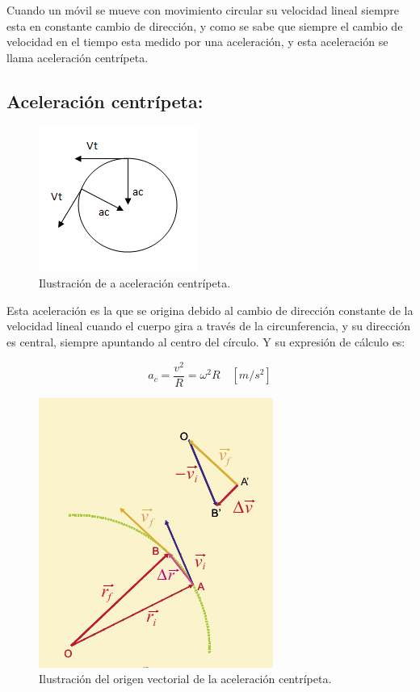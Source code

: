 \documentclass[a5paper,pagesize,10pt,bibtotoc,pointlessnumbers,
normalheadings,DIV=9,fleqn,x11names,table,twoside=false]{scrbook}
\begin{document}
Cuando un móvil se mueve con movimiento circular su velocidad lineal siempre esta en constante cambio de dirección, y como se 
sabe que siempre el cambio de velocidad en el tiempo esta medido por una aceleración, y esta aceleración se llama aceleración 
centrípeta.

\subsection{Aceleración centrípeta:}

\begin{figure}[ht]
 \centering
 \includegraphics[scale=0.6]{images/aceleracion-centripeta.jpg}
 \caption{Ilustración de a aceleración centrípeta.}\label{ac}
\end{figure}

Esta aceleración es la que se origina debido al cambio de dirección constante de la velocidad lineal cuando el cuerpo gira a 
través de la circunferencia, y su dirección es central, siempre apuntando al centro del círculo. Y su expresión de cálculo es:

\begin{equation}
a_c = \frac{v^2}{R} =  \omega^2 R\quad [m/s^2]
\end{equation}

\begin{figure}[ht]
 \centering
 \includegraphics[scale=0.6]{images/acentripeta.png}
 \caption{Ilustración del origen vectorial de la aceleración centrípeta.}\label{ac}
\end{figure} 
\end{document}

